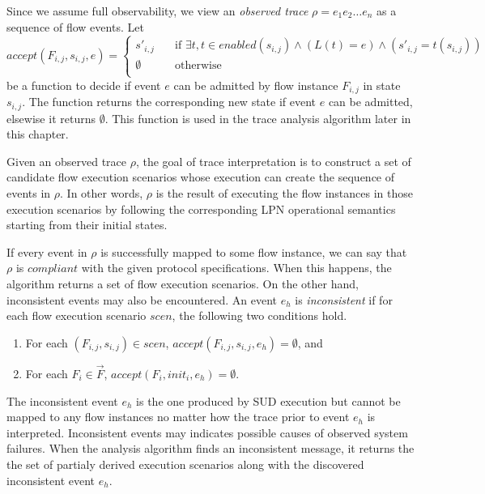 \documentclass[12pt,frontmatter,copyright,thesis]{usfmanus}
\begin{document}
 Since we assume full observability, we view
an {\em observed trace} $\rho = e_1e_2\ldots e_n$ as a
sequence of flow events.  
 Let
 \[ accept(F_{i,j}, s_{i,j}, e)=
  \begin{cases}
    s'_{i,j}       & \quad \text{if } \exists t, t \in enabled(s_{i,j}) \wedge (L(t) =e) \wedge (s'_{i,j}=t(s_{i,j}))\\
    \emptyset  & \quad \text{otherwise}\\
  \end{cases}
\]
be a function to decide if event $e$ can
be admitted by flow instance $F_{i,j}$ in state $s_{i,j}$.
The function returns the corresponding new state
if event $e$ can be admitted, elsewise
it returns $\emptyset$.
This function is used in the trace analysis algorithm later
in this chapter.

Given an observed trace $\rho$, the
goal of trace interpretation is to construct a set of
candidate flow execution scenarios whose execution can
create the sequence of events in $\rho$.  
In other words, $\rho$ is the result of executing 
the flow instances in those execution scenarios by following 
the corresponding LPN operational semantics
starting from their initial states.

 If every event in $\rho$ is successfully mapped to some
 flow instance, we can say that $\rho$ is $compliant$ with
 the given protocol specifications. When this
 happens, the algorithm returns a set of flow
 execution scenarios.
   On the other hand, inconsistent events may
 also be encountered.  An event $e_h$ is \emph{inconsistent} if
 for each flow execution scenario $\mathit{scen}$,
  the following two conditions hold.
 \begin{enumerate}
 \item For each $(F_{i,j}, s_{i,j}) \in \mathit{scen}$,
   $\mathit{accept}(F_{i,j}, s_{i,j}, e_h) = \emptyset$, and
 \item For each $F_i \in \vec{F}$, $\mathit{accept}(F_{i},
   \mathit{init}_{i}, e_h) = \emptyset$.
 \end{enumerate}

 The inconsistent event $e_h$ is the one produced by SUD execution
 but cannot be mapped to any flow instances no matter how the
 trace prior to event $e_h$ is interpreted. Inconsistent
 events may indicates possible causes of observed system failures.
 When the analysis algorithm finds an inconsistent message,
 it returns the the set of partialy derived execution scenarios along with
 the discovered inconsistent event
 $e_h$.
\end{document}
